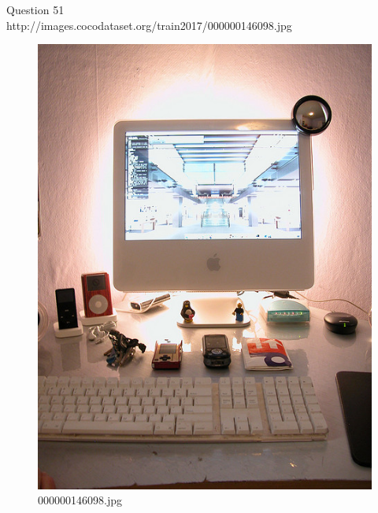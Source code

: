 Question 51\\
http://images.cocodataset.org/train2017/000000146098.jpg
\begin{figure}[h]
    \centering
    \includegraphics[width=0.8\linewidth]{../image set/hard/000000146098.jpg}
    \caption{000000146098.jpg}
\end{figure}
